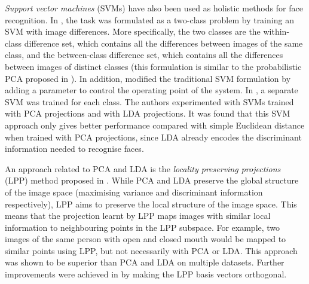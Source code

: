\documentclass[conference]{IEEEtran}
\begin{document}
\textit{Support vector machines} (SVMs) have also been used as holistic methods for face recognition. In \cite{phillips1999support}, the task was formulated as a two-class problem by training an SVM with image differences. More specifically, the two classes are the within-class difference set, which contains all the differences between images of the same class, and the between-class difference set, which contains all the differences between images of distinct classes (this formulation is similar to the probabilistic PCA proposed in \cite{moghaddam1998beyond}). In addition, \cite{phillips1999support} modified the traditional SVM formulation by adding a parameter to control the operating point of the system. In \cite{jonsson2002support}, a separate SVM was trained for each class. The authors experimented with SVMs trained with PCA projections and with LDA projections. It was found that this SVM approach only gives better performance compared with simple Euclidean distance when trained with PCA projections, since LDA already encodes the discriminant information needed to recognise faces.

An approach related to PCA and LDA is the \textit{locality preserving projections} (LPP) method proposed in \cite{he2005face}. While PCA and LDA preserve the global structure of the image space (maximising variance and discriminant information respectively), LPP aims to preserve the local structure of the image space. This means that the projection learnt by LPP maps images with similar local information to neighbouring points in the LPP subspace. For example, two images of the same person with open and closed mouth would be mapped to similar points using LPP, but not necessarily with PCA or LDA. This approach was shown to be superior than PCA and LDA on multiple datasets. Further improvements were achieved in \cite{cai2006orthogonal} by
making the LPP basis vectors orthogonal.
\end{document}
